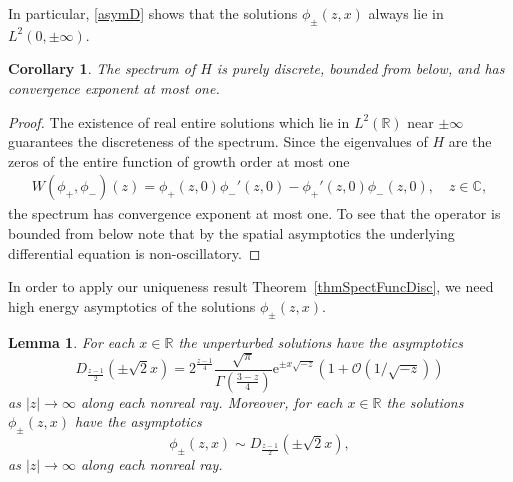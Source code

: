 \documentclass{amsart}
\newtheorem{lemma}[theorem]{Lemma}
\newtheorem{corollary}[theorem]{Corollary}
\numberwithin{equation}{section}
\begin{document}
In particular, \eqref{asymD} shows that the solutions $\phi_\pm(z,x)$ always lie in $L^2(0,\pm\infty)$.
  
\begin{corollary}
The spectrum of $H$ is purely discrete, bounded from below, and has convergence exponent at most one.
\end{corollary}

\begin{proof}
   The existence of real entire solutions which lie in $L^2({{\mathbb R}})$ near $\pm\infty$ guarantees the discreteness of the spectrum.
   Since the eigenvalues of $H$ are the zeros of the entire function of growth order at most one
   \begin{align*}
     W(\phi_+,\phi_-)(z) = \phi_+(z,0) \phi_-'(z,0) - \phi_+'(z,0) \phi_-(z,0), \quad z\in{{\mathbb C}},
   \end{align*}
   the spectrum has convergence exponent at most one. To see that the operator is bounded from below note that by the
   spatial asymptotics the underlying differential equation is non-oscillatory.
\end{proof}

In order to apply our uniqueness result Theorem~\ref{thmSpectFuncDisc}, we need high energy asymptotics of the solutions $\phi_\pm(z,x)$.

\begin{lemma}\label{lempertharmphiasym}
For each $x\in{{\mathbb R}}$ the unperturbed solutions have the asymptotics
\begin{equation}
  D_{\frac{z-1}{2}}(\pm\sqrt{2}x) = 2^{\frac{z-1}{4}} \frac{\sqrt{\pi}}{\Gamma\left(\frac{3-z}{4}\right)} {\mathrm{e}}^{\pm x \sqrt{-z}} \left(1 + {\mathcal{O}}\left(1/\sqrt{-z}\right)\right)
\end{equation}
as $|z|\rightarrow\infty$ along each nonreal ray.
 Moreover, 
 for each $x\in{{\mathbb R}}$ the solutions $\phi_\pm(z,x)$ have the asymptotics
 \begin{equation}
  \phi_\pm(z,x) \sim D_{\frac{z-1}{2}}(\pm\sqrt{2}x),
 \end{equation}
 as $|z|\rightarrow\infty$ along each nonreal ray.
\end{lemma}
\end{document}
